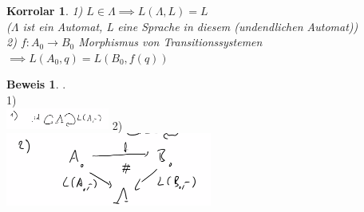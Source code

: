 \documentclass{article}
\newtheorem{korrolar}{Korrolar}[section]
\theoremstyle{definition}
\newtheorem{beweis}{Beweis}[section]
\begin{document}
	\begin{korrolar}\label{KorrolarSprache} 1) $L\in\Lambda\implies L(\Lambda, L) = L$\\
	 ($\Lambda$ ist ein Automat, L eine Sprache in diesem (undendlichen Automat))\\
	 2) $f:A_0\to B_0$ Morphismus von Transitionssystemen $\implies L(A_0,q)= L(B_0,f(q))$
	 \end{korrolar}
	 \begin{beweis}.\\
	 1)\\
	 \includegraphics[width=128px]{images/LausLambda.png}
	 2)\\
	 \includegraphics[width=256px]{images/Kommutation.png}
	 \end{beweis}
\end{document}
